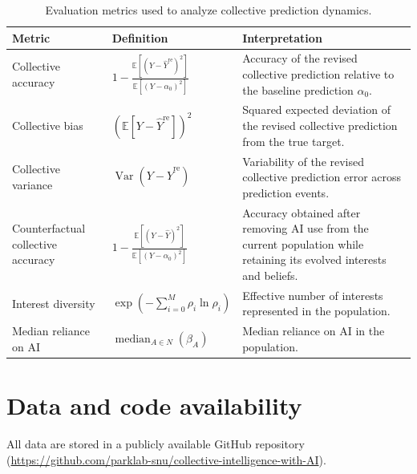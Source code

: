 \documentclass[12pt]{article}
\begin{document}
\begin{table}[htbp]
\centering
\caption{Evaluation metrics used to analyze collective prediction dynamics.}
\label{tab:evaluation_metrics}
\renewcommand{\arraystretch}{1.25}
\begin{tabularx}{\textwidth}{@{}L{0.28\textwidth} C{0.27\textwidth} Y@{}}
\toprule
Metric & Definition & Interpretation \\
\midrule

Collective accuracy &
\(\displaystyle 1-\frac{\mathbb{E}[(Y-\hat{Y}^{\mathrm{re}})^2]}{\mathbb{E}[(Y-\alpha_0)^2]}\) &
Accuracy of the revised collective prediction relative to the baseline prediction $\alpha_0$. \\
\addlinespace

Collective bias &
\(\displaystyle \left(\mathbb{E}[Y-\hat{Y}^{\mathrm{re}}]\right)^2\) &
Squared expected deviation of the revised collective prediction from the true target. \\
\addlinespace

Collective variance &
\(\displaystyle \operatorname{Var}(Y-\hat{Y}^{\mathrm{re}})\) &
Variability of the revised collective prediction error across prediction events. \\
\addlinespace

Counterfactual collective accuracy &
\(\displaystyle 1-\frac{\mathbb{E}[(Y-\hat{Y})^2]}{\mathbb{E}[(Y-\alpha_0)^2]}\) &
Accuracy obtained after removing AI use from the current population while retaining its evolved interests and beliefs. \\
\addlinespace

Interest diversity &
\(\displaystyle \exp\left(-\sum_{i=0}^{M}\rho_i\ln\rho_i\right)\) &
Effective number of interests represented in the population. \\
\addlinespace

Median reliance on AI &
\(\displaystyle \operatorname{median}_{A\in N}(\beta_A)\) &
Median reliance on AI in the population. \\

\bottomrule
\end{tabularx}
\end{table}

\section*{Data and code availability}

All data are stored in a publicly available GitHub repository (\url{https://github.com/parklab-snu/collective-intelligence-with-AI}).
\end{document}
